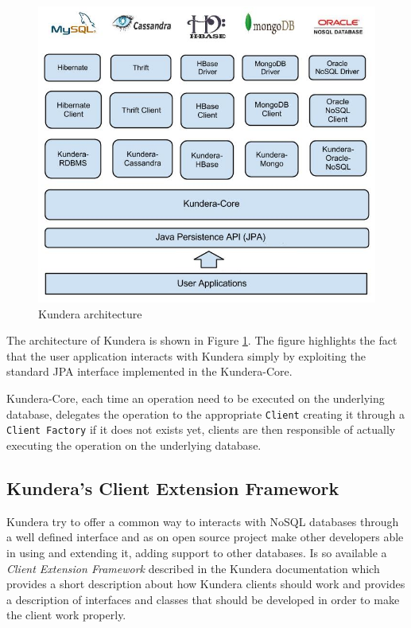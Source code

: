 \begin{figure}[tbh]
  \centering
  \includegraphics[scale=0.5]{images/kundera_architecture}
  \caption{Kundera architecture}
  \label{fig:kundera_architecture}
\end{figure}

\noindent The architecture of Kundera is shown in Figure \ref{fig:kundera_architecture}. The figure highlights the fact that the user application interacts with Kundera simply by exploiting the standard JPA interface implemented in the Kundera-Core.

\noindent Kundera-Core, each time an operation need to be executed on the underlying database, delegates the operation to the appropriate \texttt{Client} creating it through a \texttt{Client Factory} if it does not exists yet, clients are then responsible of actually executing the operation on the underlying database.

\subsection{Kundera's Client Extension Framework}
Kundera try to offer a common way to interacts with NoSQL databases through a well defined interface and as on open source project make other developers able in using and extending it, adding support to other databases.
Is so available a \textit{Client Extension Framework} described in the Kundera documentation which provides a short description about how Kundera clients should work and provides a description of interfaces and classes that should be developed in order to make the client work properly.

